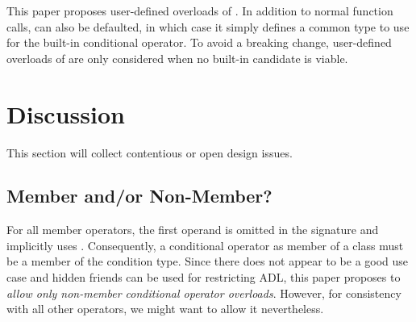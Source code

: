 \newcommand\wgTitle{Making operator?: overloadable}
\newcommand\wgName{Matthias Kretz <m.kretz@gsi.de>}
\newcommand\wgDocumentNumber{P0917R5}
\newcommand\wgGroup{EWG}
\newcommand\wgTarget{\CC{}29}

\usepackage{mymacros}
\usepackage{wg21}
\usepackage{changelog}
\usepackage{underscore}



\lstset{numbers=left}


\begin{wgTitlepage}
  This paper proposes user-defined overloads of .
  In addition to normal function calls,  can also be
  defaulted, in which case it simply defines a common type to use for the
  built-in conditional operator.
  To avoid a breaking change, user-defined overloads of  are
  only considered when no built-in candidate is viable.
\end{wgTitlepage}

\pagestyle{scrheadings}







\pagebreak



\pagebreak
\section{Discussion}

This section will collect contentious or open design issues.

\subsection{Member and/or Non-Member?}

For all member operators, the first operand is omitted in the signature and implicitly uses .
Consequently, a conditional operator as member of a class must be a member of the condition type.
Since there does not appear to be a good use case and hidden friends can be used for restricting ADL, this paper proposes to \emph{allow only non-member conditional operator overloads}.
However, for consistency with all other operators, we might want to allow it nevertheless.

%


\appendix
\let\appendix=\relax



